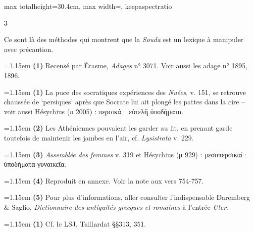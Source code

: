 \documentclass[11pt,twoside]{book}
\newcommand{\italique}[1]{\textit{#1}}
\newcommand{\LSJ}{LSJ}
\newcommand{\grec}[1]{{\policeGr #1}}
\newcommand{\latin}[1]{\textit{#1}}
\begin{document}
\begin{adjustbox}{max totalheight=30.4cm, max width=\textwidth, keepaspectratio}
\begin{minipage}{\textwidth}
{\begin{multicols}{3}
\par\vspace{1.5pt}
\noindent Ce sont là des méthodes qui montrent que la \italique{Souda} est un lexique à manipuler avec précaution.
\par\vspace{1.5pt}
\par\vspace{1.2pt}\par\nopagebreak\vspace{1pt}\noindent\hangindent=1.15em {\color{sepiaNote}\textbf{(1)}} Recensé par Érasme, \italique{Adages} n° 3071. Voir aussi les adage n° 1895, 1896.
\par\vspace{1.5pt}
\noindent\hangindent=1.15em {\color{sepiaNote}\textbf{(1)}} La puce des socratiques expériences des \italique{Nuées}, v. 151, se retrouve chaussée de `persiques' après que Socrate lui ait plongé les pattes dans la cire – voir aussi Hésychius (π 2005) : \grec{περσικά· εὐτελῆ ὑποδήματα}.
\par\vspace{1.5pt}
\noindent\hangindent=1.15em {\color{sepiaNote}\textbf{(2)}} Les Athéniennes pouvaient les garder au lit, en prenant garde toutefois de maintenir les jambes en l'air, cf. \italique{Lysistrata} v. 229.
\par\vspace{1.5pt}
\noindent\hangindent=1.15em {\color{sepiaNote}\textbf{(3)}} \italique{Assemblée des femmes} v. 319 et Hésychius (μ 929) : \grec{μεσοπερσικαί· ὑποδήματα γυναικεῖα}.
\par\vspace{1.5pt}
\noindent\hangindent=1.15em {\color{sepiaNote}\textbf{(4)}} Reproduit en annexe. Voir la note aux vers 754-757.
\par\vspace{1.5pt}
\noindent\hangindent=1.15em {\color{sepiaNote}\textbf{(5)}} Pour plus d'informations, aller consulter l'indispensable Daremberg \& Saglio, \italique{Dictionnaire des antiquités grecques et romaines} à l'entrée \latin{Uter}.
\par\vspace{1.5pt}
\noindent\hangindent=1.15em {\color{sepiaNote}\textbf{(1)}} Cf. le \LSJ , Taillardat §§313, 351.
\par\vspace{1.5pt}

\end{multicols}}
\end{minipage}
\end{adjustbox}
\end{document}
